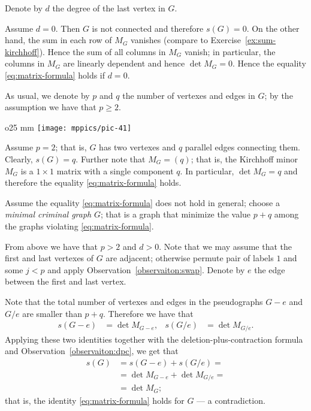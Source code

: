 Denote by $d$ the degree of the last vertex in $G$.

Assume $d=0$.
Then $G$ is not connected and therefore $s(G)=0$.
On the other hand, the sum in each row of $M_G$ vanishes (compare to Exercise~\ref{ex:sum-kirchhoff}).
Hence the sum of all columns in $M_G$ vanish;
in particular, the columns in $M_G$ are linearly dependent and hence $\det M_G=0$.
Hence the equality \ref{eq:matrix-formula} holds if $d=0$.

As usual, we denote by $p$ and $q$ the number of vertexes and edges in $G$; by the assumption we have that $p\ge 2$.

\begin{wrapfigure}{o}{25 mm}
\vskip0mm
\centering
\texttt{[image: mppics/pic-41]}
\end{wrapfigure}

Assume $p=2$; that is, $G$ has two vertexes and $q$ parallel edges connecting them.
Clearly, $s(G)=q$.
Further note that $M_G=(q)$; that is,  the Kirchhoff minor $M_G$ is a $1{\times}1$ matrix with a single component $q$.
In particular, $\det M_G=q$ and therefore the equality \ref{eq:matrix-formula} holds.

Assume the equality \ref{eq:matrix-formula} does not hold in general;
choose a \emph{minimal criminal graph} $G$;
that is a graph that minimize the value $p+q$ among the graphs violating \ref{eq:matrix-formula}.

From above we have that $p>2$ and $d>0$.
Note that we may assume that the first and last vertexes of $G$ are adjacent;
otherwise permute pair of labels $1$ and some $j<p$  and apply Observation~\ref{observaiton:swap}.
Denote by $e$ the edge between the first and last vertex.

Note that the total number of vertexes and edges in the pseudographs $G- e$ and $G/e$ are smaller than $p+q$.
Therefore we have that
\begin{align*}
s(G- e)&=\det M_{G- e},
&
s(G/e)&=\det M_{G/e}.
\end{align*}
Applying these two identities together with the deletion-plus-contraction formula 
and Observation~\ref{observaiton:dpc}, we get that
\begin{align*}
s(G)&=s(G- e)+s(G/e)=
\\
&=\det M_{G- e}+\det M_{G/e}=
\\
&=\det M_G;
\end{align*}
that is, the identity \ref{eq:matrix-formula} holds for $G$ --- a contradiction.
\qeds


